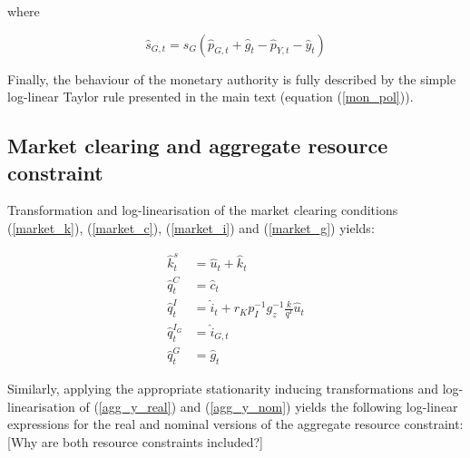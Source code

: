 \documentclass[a4paper,11pt]{article}
\numberwithin{equation}{section}
\begin{document}
	where
	
	\begin{equation}
	\hat{s}_{G,t}=s_G\left(\hat{p}_{G,t}+\hat{g}_t-\hat{p}_{Y,t}-\hat{y}_t\right)
	\end{equation}
	
%	
%	
%	
%	
%	
	
	Finally, the behaviour of the monetary authority is fully described by the simple log-linear Taylor rule presented in the main text (equation (\ref{mon_pol})).
	
	\subsection{Market clearing and aggregate resource constraint}
	
	Transformation and log-linearisation of the market clearing conditions (\ref{market_k}), (\ref{market_c}), (\ref{market_i}) and (\ref{market_g}) yields:
	
	\begin{align}
	\hat{k}_t^s&=\hat{u}_t+\hat{k}_t\\
	\hat{q}_t^C&=\hat{c}_t\\
	\hat{q}_t^I&=\hat{i}_t+r_Kp_I^{-1}g_z^{-1}\frac{k}{q^I}\hat{u}_t\\
	\hat{q}_t^{I_G}&=\hat{i}_{G,t}\\
	\hat{q}_t^G&=\hat{g}_t
	\end{align}
	
	Similarly, applying the appropriate stationarity inducing transformations and log-linearisation of (\ref{agg_y_real}) and (\ref{agg_y_nom}) yields the following log-linear expressions for the real and nominal versions of the aggregate resource constraint: {\color{red}[Why are both resource constraints included?]}
	
\end{document}
